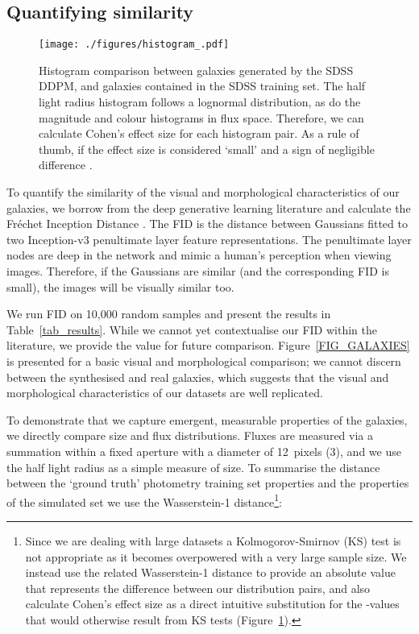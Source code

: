 \documentclass[fleqn,usenatbib]{mnras}
\begin{document}
\subsection{Quantifying similarity} \label{sec_sgd}

\begin{figure}
    \centering
    \texttt{[image: ./figures/histogram\_.pdf]}
    \caption{Histogram comparison between galaxies generated by the SDSS DDPM,
    and galaxies contained in the SDSS training set. The half
    light radius histogram follows a lognormal distribution, as do the
    magnitude and colour histograms in flux space. Therefore, we can calculate
    Cohen's  effect size for each histogram pair. As a rule of thumb, if  the effect size is considered `small' and a sign of negligible
    difference \citep{cite_cohen1988}.}
    \label{fig_hists_qqs}
\end{figure}

To quantify the similarity of the visual and morphological characteristics of
our galaxies, we borrow from the deep generative learning literature and
calculate the Fr\'echet Inception Distance
\citep[FID;][]{cite_heusel2017,cite_seitzer2020}. The FID is the distance
\citep{cite_dowson1982} between Gaussians fitted to two Inception-v3
\citep{cite_szegedy2016} penultimate layer feature representations. The
penultimate layer nodes are deep in the network and mimic a human's perception
when viewing images. Therefore, if the Gaussians are similar (and the
corresponding FID is small), the images will be visually similar too.

We run FID on 10,000 random samples and present the results in
Table~\ref{tab_results}.  While we cannot yet contextualise our
FID within the literature, we provide the value for future comparison.  
Figure~\ref{FIG_GALAXIES} is presented for a basic visual and morphological
comparison; we cannot discern between the synthesised and real galaxies, which
suggests that the visual and morphological characteristics of our datasets are
well replicated.

To demonstrate that we capture emergent, measurable properties of the galaxies,
we directly compare size and flux distributions. Fluxes are measured via a
summation within a fixed aperture with a diameter of 12~pixels (3),
and we use the half light radius as a simple measure of size. To summarise the
distance between the `ground truth' photometry training set properties and the
properties of the simulated set we use the Wasserstein-1 distance\footnote{
    Since we are dealing with large datasets a Kolmogorov-Smirnov
    (KS) test is not appropriate as it becomes overpowered with a very large sample size.  We
    instead use the related Wasserstein-1 distance to provide an absolute value
    that represents the difference between our distribution pairs, and also
    calculate Cohen's  effect size as a direct intuitive substitution for
    the -values that would otherwise result from KS tests
    (Figure~\ref{fig_hists_qqs}).
}:
\end{document}
